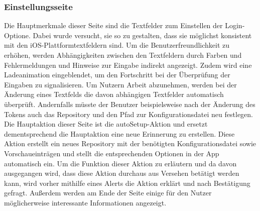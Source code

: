 \subsubsection{Einstellungsseite}%
Die Hauptmerkmale dieser Seite sind die Textfelder zum Einstellen der Login-Optione. %
	Dabei wurde versucht, sie so zu gestalten, dass sie möglichst konsistent mit den iOS-Plattformtextfeldern sind.\newline%
Um die Benutzerfreundlichkeit zu erhöhen, werden Abhängigkeiten zwischen den Textfeldern durch Farben und Fehlermeldungen und Hinweise zur Eingabe indirekt angezeigt. Zudem wird eine Ladeanimation eingeblendet, um den Fortschritt bei der Überprüfung der Eingaben zu signalisieren.
Um Nutzern Arbeit abzunehmen, werden bei der Änderung eines Textfelds die davon abhängigen Textfelder automatisch überprüft. Andernfalls müsste der Benutzer beispielsweise nach der Änderung des Tokens auch das Repository und den Pfad zur Konfigurationsdatei neu festlegen.\newline%
Die Hauptaktion dieser Seite ist die \glqq autoSetup-Aktion\grqq{} und ersetzt dementsprechend die Hauptaktion eine neue Erinnerung zu erstellen. Diese Aktion erstellt ein neues Repository mit der benötigten Konfigurationsdatei sowie Vorschaueinträgen und stellt die entsprechenden Optionen in der App automatisch ein. Um die Funktion dieser Aktion zu erläutern und da davon ausgegangen wird, dass diese Aktion durchaus aus Versehen betätigt werden kann, wird vorher mithilfe eines \glqq Alerts\grqq{} die Aktion erklärt und nach Bestätigung gefragt.\newline%
Außerdem werden am Ende der Seite einige für den Nutzer möglicherweise interessante Informationen angezeigt.%
